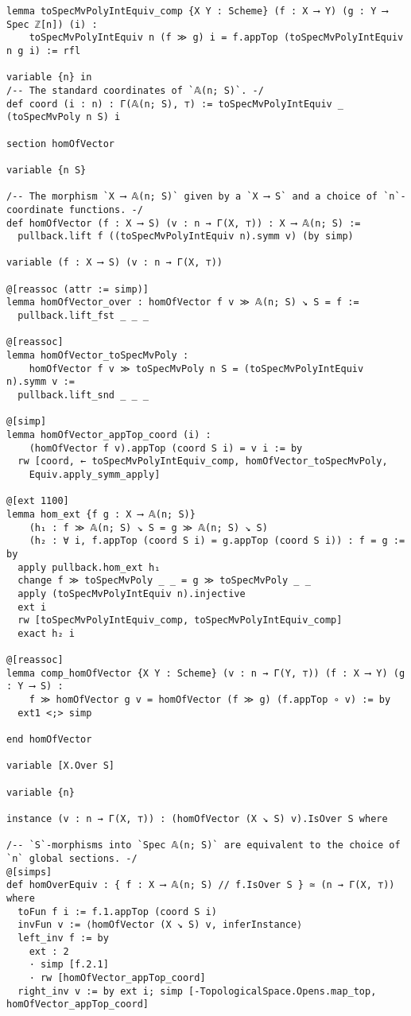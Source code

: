 \documentclass{article}
\begin{document}
\begin{lstlisting}[language=Lean, caption={AffineSpace.lean}]
lemma toSpecMvPolyIntEquiv_comp {X Y : Scheme} (f : X ⟶ Y) (g : Y ⟶ Spec ℤ[n]) (i) :
    toSpecMvPolyIntEquiv n (f ≫ g) i = f.appTop (toSpecMvPolyIntEquiv n g i) := rfl

variable {n} in
/-- The standard coordinates of `𝔸(n; S)`. -/
def coord (i : n) : Γ(𝔸(n; S), ⊤) := toSpecMvPolyIntEquiv _ (toSpecMvPoly n S) i

section homOfVector

variable {n S}

/-- The morphism `X ⟶ 𝔸(n; S)` given by a `X ⟶ S` and a choice of `n`-coordinate functions. -/
def homOfVector (f : X ⟶ S) (v : n → Γ(X, ⊤)) : X ⟶ 𝔸(n; S) :=
  pullback.lift f ((toSpecMvPolyIntEquiv n).symm v) (by simp)

variable (f : X ⟶ S) (v : n → Γ(X, ⊤))

@[reassoc (attr := simp)]
lemma homOfVector_over : homOfVector f v ≫ 𝔸(n; S) ↘ S = f :=
  pullback.lift_fst _ _ _

@[reassoc]
lemma homOfVector_toSpecMvPoly :
    homOfVector f v ≫ toSpecMvPoly n S = (toSpecMvPolyIntEquiv n).symm v :=
  pullback.lift_snd _ _ _

@[simp]
lemma homOfVector_appTop_coord (i) :
    (homOfVector f v).appTop (coord S i) = v i := by
  rw [coord, ← toSpecMvPolyIntEquiv_comp, homOfVector_toSpecMvPoly,
    Equiv.apply_symm_apply]

@[ext 1100]
lemma hom_ext {f g : X ⟶ 𝔸(n; S)}
    (h₁ : f ≫ 𝔸(n; S) ↘ S = g ≫ 𝔸(n; S) ↘ S)
    (h₂ : ∀ i, f.appTop (coord S i) = g.appTop (coord S i)) : f = g := by
  apply pullback.hom_ext h₁
  change f ≫ toSpecMvPoly _ _ = g ≫ toSpecMvPoly _ _
  apply (toSpecMvPolyIntEquiv n).injective
  ext i
  rw [toSpecMvPolyIntEquiv_comp, toSpecMvPolyIntEquiv_comp]
  exact h₂ i

@[reassoc]
lemma comp_homOfVector {X Y : Scheme} (v : n → Γ(Y, ⊤)) (f : X ⟶ Y) (g : Y ⟶ S) :
    f ≫ homOfVector g v = homOfVector (f ≫ g) (f.appTop ∘ v) := by
  ext1 <;> simp

end homOfVector

variable [X.Over S]

variable {n}

instance (v : n → Γ(X, ⊤)) : (homOfVector (X ↘ S) v).IsOver S where

/-- `S`-morphisms into `Spec 𝔸(n; S)` are equivalent to the choice of `n` global sections. -/
@[simps]
def homOverEquiv : { f : X ⟶ 𝔸(n; S) // f.IsOver S } ≃ (n → Γ(X, ⊤)) where
  toFun f i := f.1.appTop (coord S i)
  invFun v := ⟨homOfVector (X ↘ S) v, inferInstance⟩
  left_inv f := by
    ext : 2
    · simp [f.2.1]
    · rw [homOfVector_appTop_coord]
  right_inv v := by ext i; simp [-TopologicalSpace.Opens.map_top, homOfVector_appTop_coord]


\end{lstlisting}
\end{document}
